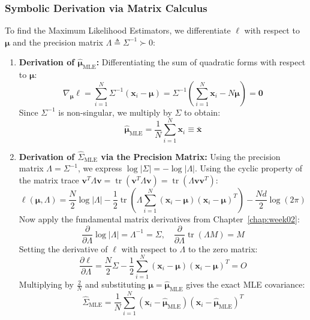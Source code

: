 \subsubsection{Symbolic Derivation via Matrix Calculus}
To find the Maximum Likelihood Estimators, we differentiate $\ell$ with respect to $\boldsymbol{\mu}$ and the precision matrix $\Lambda \triangleq \Sigma^{-1} \succ 0$:
\begin{enumerate}
    \item \textbf{Derivation of $\hat{\boldsymbol{\mu}}_{\text{MLE}}$:}
    Differentiating the sum of quadratic forms with respect to $\boldsymbol{\mu}$:
    \begin{equation}
    \nabla_{\boldsymbol{\mu}} \ell = \sum_{i=1}^N \Sigma^{-1}(\mathbf{x}_i - \boldsymbol{\mu}) = \Sigma^{-1}\left( \sum_{i=1}^N \mathbf{x}_i - N\boldsymbol{\mu} \right) = \mathbf{0}
    \end{equation}
    Since $\Sigma^{-1}$ is non-singular, we multiply by $\Sigma$ to obtain:
    \begin{equation}
    \hat{\boldsymbol{\mu}}_{\text{MLE}} = \frac{1}{N}\sum_{i=1}^N \mathbf{x}_i \equiv \bar{\mathbf{x}}
    \end{equation}
    
    \item \textbf{Derivation of $\hat{\Sigma}_{\text{MLE}}$ via the Precision Matrix:}
    Using the precision matrix $\Lambda = \Sigma^{-1}$, we express $\log|\Sigma| = -\log|\Lambda|$. Using the cyclic property of the matrix trace $\mathbf{v}^T \Lambda \mathbf{v} = \operatorname{tr}(\mathbf{v}^T \Lambda \mathbf{v}) = \operatorname{tr}(\Lambda \mathbf{v}\mathbf{v}^T)$:
    \begin{equation}
    \ell(\boldsymbol{\mu}, \Lambda) = \frac{N}{2}\log|\Lambda| - \frac{1}{2}\operatorname{tr}\left( \Lambda \sum_{i=1}^N (\mathbf{x}_i - \boldsymbol{\mu})(\mathbf{x}_i - \boldsymbol{\mu})^T \right) - \frac{Nd}{2}\log(2\pi)
    \end{equation}
    Now apply the fundamental matrix derivatives from Chapter~\ref{chap:week02}:
    \begin{equation}
    \frac{\partial}{\partial \Lambda}\log|\Lambda| = \Lambda^{-1} = \Sigma, \quad \frac{\partial}{\partial \Lambda}\operatorname{tr}(\Lambda M) = M
    \end{equation}
    Setting the derivative of $\ell$ with respect to $\Lambda$ to the zero matrix:
    \begin{equation}
    \frac{\partial \ell}{\partial \Lambda} = \frac{N}{2}\Sigma - \frac{1}{2}\sum_{i=1}^N (\mathbf{x}_i - \boldsymbol{\mu})(\mathbf{x}_i - \boldsymbol{\mu})^T = O
    \end{equation}
    Multiplying by $\frac{2}{N}$ and substituting $\boldsymbol{\mu} = \hat{\boldsymbol{\mu}}_{\text{MLE}}$ gives the exact MLE covariance:
    \begin{equation}
    \hat{\Sigma}_{\text{MLE}} = \frac{1}{N}\sum_{i=1}^N (\mathbf{x}_i - \hat{\boldsymbol{\mu}}_{\text{MLE}})(\mathbf{x}_i - \hat{\boldsymbol{\mu}}_{\text{MLE}})^T
    \end{equation}
\end{enumerate}

